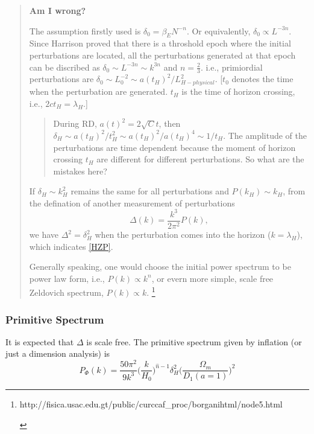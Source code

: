 \vspace{2ex}
\begin{quote}


{\bf{Am I wrong?}}

The assumption firstly used is $\delta_0=\beta_E N^{-n}$. Or equivalently, $\delta_0\propto L^{-3n}$. Since Harrison proved that there is a throshold epoch where the initial perturbations are located, all the perturbations generated at that epoch can be discribed as $\delta_0\sim L^{-3n} \sim k^{3n}$ and $n=\frac{2}{3}$. i.e., primiordial perturbations are $\delta_0\sim L_0^{-2}\sim a(t_H)^2/L_{H-physical}^2$. [$t_0$ denotes the time when the perturbation are generated. $t_H$ is the time of horizon crossing, i.e., $2ct_H=\lambda_H$.]

\begin{quote}


During RD, $a(t)^2=2\sqrt C t$, then $\delta_H\sim a(t_H)^2/t_H^2 \sim a(t_H)^2/a(t_H)^4 \sim 1/t_H$. The amplitude of the perturbations are time dependent because the moment of horizon crossing $t_H$ are different for different perturbations. So what are the mistakes here?
\end{quote}


If $\delta_H\sim k_H^2$ remains the same for all perturbations and $P(k_H)\sim k_H$, from the defination of another measurement of perturbations
\begin{equation}\Delta(k)=\frac{k^3}{2\pi^2}P(k),
\end{equation}
we have $\Delta^2=\delta_H^2$ when the perturbation comes into the horizon ($k=\lambda_H$), which indicates \ref{HZP}.

Generally speaking, one would choose the initial power spectrum to be power law form, i.e., $P(k)\propto k^n$, or evern more simple, scale free Zeldovich spectrum, $P(k)\propto k$.
\footnote{\begin{url} {http://fisica.usac.edu.gt/public/curccaf_proc/borganihtml/node5.html}
\end{url}
}
 
\end{quote}


\subsubsection{Primitive Spectrum}
It is expected that $\Delta$ is scale free.
The primitive spectrum given by inflation (or just a dimension analysis) is
\begin{equation}
P_\Phi(k)=\frac{50\pi^2}{9k^3}\bigg( \frac{k}{H_0} \bigg)^{\hat{n}-1}\delta_H^2\bigg(\frac{\Omega_m}{D_1(a=1)}\bigg)^2
\end{equation}

